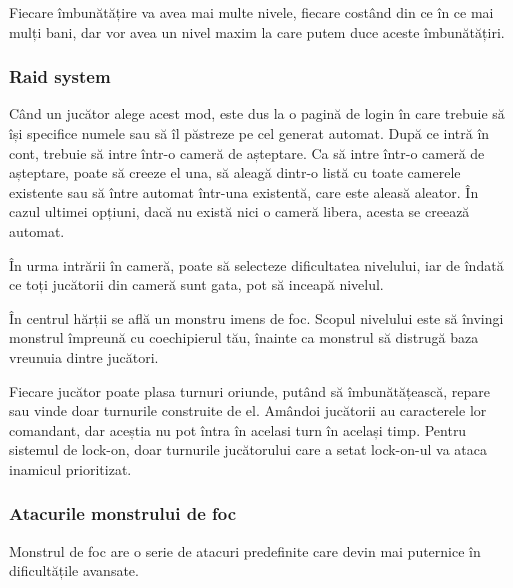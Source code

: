 \documentclass[12pt, a4paper]{article}
\begin{document}
	Fiecare îmbunătățire va avea mai multe nivele, fiecare costând din ce în ce mai mulți bani, dar vor avea un nivel maxim la care putem duce aceste îmbunătățiri.
	
	
	
	
	
	\subsubsection{Raid system}
	
	Când un jucător alege acest mod, este dus la o pagină de login în care trebuie să își specifice numele sau să îl păstreze pe cel generat automat. După ce intră în cont, trebuie să intre într-o cameră de așteptare. Ca să intre într-o cameră de așteptare, poate să creeze el una, să aleagă dintr-o listă cu toate camerele existente sau să între automat într-una existentă, care este aleasă aleator. În cazul ultimei opțiuni, dacă nu există nici o cameră libera, acesta se creează automat. 
	\newline
	
	În urma intrării în cameră, poate să selecteze dificultatea nivelului, iar de îndată ce toți jucătorii din cameră sunt gata, pot să inceapă nivelul.
	\newline
	
	În centrul hărții se află un monstru imens de foc. Scopul nivelului este să învingi monstrul împreună cu coechipierul tău, înainte ca monstrul să distrugă baza vreunuia dintre jucători.
	\newline
	
	Fiecare jucător poate plasa turnuri oriunde, putând să îmbunătățească, repare sau vinde doar turnurile construite de el. Amândoi jucătorii au caracterele lor comandant, dar aceștia nu pot întra în acelasi turn în același timp. Pentru sistemul de lock-on, doar turnurile jucătorului care a setat lock-on-ul va ataca inamicul prioritizat.
	
	
	
	
	
	\subsubsection{Atacurile monstrului de foc}
	
	Monstrul de foc are o serie de atacuri predefinite care devin mai puternice în dificultățile avansate.
	
\end{document}
